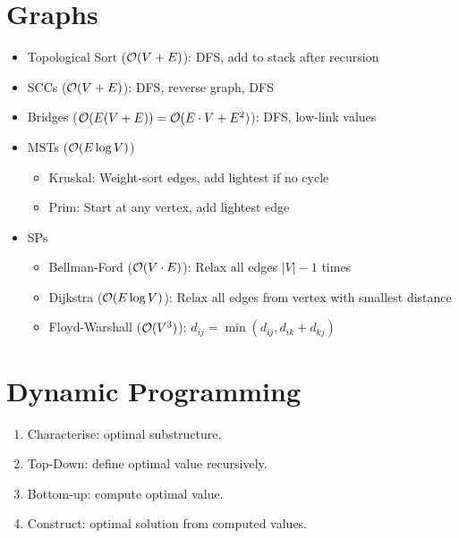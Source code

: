 \documentclass{article}
\begin{document}
\section{Graphs}
\begin{itemize}
  \item Topological Sort ($\mathcal{O}(V+E)$): DFS, add to stack after recursion
  \item SCCs ($\mathcal{O}(V+E)$): DFS, reverse graph, DFS
  \item Bridges ($\mathcal{O}(E(V+E))=\mathcal{O}(E\cdot V+E^2)$): DFS, low-link values
  \item MSTs ($\mathcal{O}(E\log V)$) \begin{itemize}
          \item Kruskal: Weight-sort edges, add lightest if no cycle
          \item Prim: Start at any vertex, add lightest edge
        \end{itemize}
  \item SPs \begin{itemize}
          \item Bellman-Ford ($\mathcal{O}(V\cdot E)$): Relax all edges $|V|-1$ times
          \item Dijkstra ($\mathcal{O}(E\log V)$): Relax all edges from vertex with smallest distance
          \item Floyd-Warshall ($\mathcal{O}(V^3)$): $d_{ij} = \min(d_{ij},d_{ik}+d_{kj})$
        \end{itemize}
\end{itemize}

\section{Dynamic Programming}
\begin{enumerate}
  \item Characterise: optimal substructure.
  \item Top-Down: define optimal value recursively.
  \item Bottom-up: compute optimal value.
  \item Construct: optimal solution from computed values.
\end{enumerate}
\end{document}
